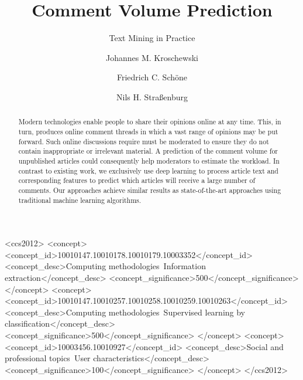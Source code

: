 \documentclass[10pt,sigconf]{acmart}
\begin{document}
\title{Comment Volume Prediction}
\subtitle{Text Mining in Practice} 

\author{Johannes M. Kroschewski}

\author{Friedrich C. Schöne}

\author{Nils H. Straßenburg}

\begin{abstract}
Modern technologies enable people to share their opinions online at any time.
This, in turn, produces online comment threads in which a vast range of opinions may be put forward. 
Such online discussions require must be moderated to ensure they do not contain inappropriate or irrelevant material. A prediction of the comment volume for unpublished articles could consequently help moderators to estimate the workload. 
In contrast to existing work, we exclusively use deep learning to process article text and corresponding features to predict which articles will receive a large number of comments.
Our approaches achieve similar results as state-of-the-art approaches using traditional machine learning algorithms.
\end{abstract}

\begin{CCSXML}
	<ccs2012>
	<concept>
	<concept_id>10010147.10010178.10010179.10003352</concept_id>
	<concept_desc>Computing methodologies~Information extraction</concept_desc>
	<concept_significance>500</concept_significance>
	</concept>
	<concept>
	<concept_id>10010147.10010257.10010258.10010259.10010263</concept_id>
	<concept_desc>Computing methodologies~Supervised learning by classification</concept_desc>
	<concept_significance>500</concept_significance>
	</concept>
	<concept>
	<concept_id>10003456.10010927</concept_id>
	<concept_desc>Social and professional topics~User characteristics</concept_desc>
	<concept_significance>100</concept_significance>
	</concept>
	</ccs2012>
\end{CCSXML}
\end{document}
